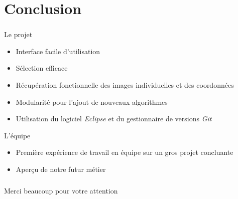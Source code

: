 \documentclass[11pt]{beamer}
\begin{document}
\section{Conclusion}

\begin{frame}
\frametitle{\secname}
	\begin{block}{Le projet}
		\begin{itemize}
			\item Interface facile d'utilisation
			\item Sélection efficace
			\item Récupération fonctionnelle des images individuelles et des coordonnées 
			\item Modularité pour l'ajout de nouveaux algorithmes
			\item Utilisation du logiciel \emph{Eclipse} et du gestionnaire de versions \emph{Git}
		\end{itemize}
	\end{block}
	\begin{block}{L'équipe}
		\begin{itemize}
			\item Première expérience de travail en équipe sur un gros projet concluante
			\item Aperçu de notre futur métier
		\end{itemize}
	\end{block}
\end{frame}
\begin{frame}
	\frametitle{}
	\begin{block}{}
		\begin{center}
			Merci beaucoup pour votre attention  %
		\end{center}
	\end{block}
\end{frame}
\end{document}
